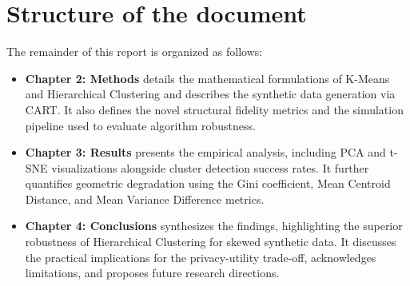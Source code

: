 \section{Structure of the document}
\label{sec:structure}
The remainder of this report is organized as follows:
\begin{itemize}
  \item \textbf{Chapter 2: Methods} details the mathematical formulations of K-Means and Hierarchical Clustering and describes the synthetic data generation via CART. It also defines the novel structural fidelity metrics and the simulation pipeline used to evaluate algorithm robustness.
  \item \textbf{Chapter 3: Results} presents the empirical analysis, including PCA and t-SNE visualizations alongside cluster detection success rates. It further quantifies geometric degradation using the Gini coefficient, Mean Centroid Distance, and Mean Variance Difference metrics.
  \item \textbf{Chapter 4: Conclusions} synthesizes the findings, highlighting the superior robustness of Hierarchical Clustering for skewed synthetic data. It discusses the practical implications for the privacy-utility trade-off, acknowledges limitations, and proposes future research directions.
\end{itemize}